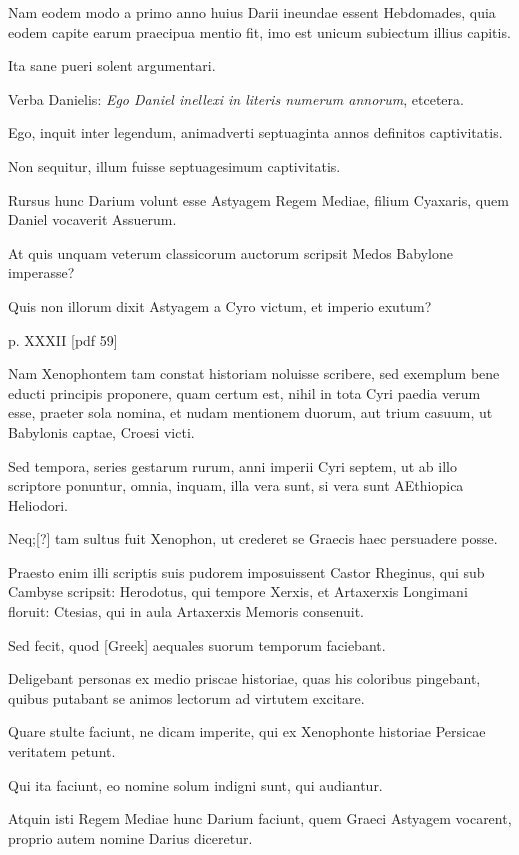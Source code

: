 \begin{parnumbers}
Nam eodem modo
a primo anno huius Darii ineundae essent Hebdomades, quia eodem
capite earum praecipua mentio fit, imo est unicum subiectum illius
capitis.

Ita sane pueri solent argumentari.

Verba Danielis: \textit{Ego
Daniel inellexi in literis numerum annorum}, etcetera.

Ego, inquit inter
legendum, animadverti septuaginta annos definitos captivitatis.

Non sequitur, illum fuisse septuagesimum captivitatis.

Rursus hunc
Darium volunt esse Astyagem Regem Mediae, filium Cyaxaris,
quem Daniel vocaverit Assuerum.

At quis unquam veterum classicorum
auctorum scripsit Medos Babylone imperasse?

Quis non
illorum dixit Astyagem a Cyro victum, et imperio exutum?

\clearpage
p. XXXII [pdf 59]

Nam Xenophontem tam constat historiam noluisse scribere, sed exemplum
bene educti principis proponere, quam certum est, nihil in tota Cyri
paedia verum esse, praeter sola nomina, et nudam mentionem duorum,
aut trium casuum, ut Babylonis captae, Croesi victi.

Sed tempora,
series gestarum rurum, anni imperii Cyri septem, ut ab illo
scriptore ponuntur, omnia, inquam, illa vera sunt, si vera sunt AEthiopica
Heliodori.

Neq;[?] tam sultus fuit Xenophon, ut crederet se
Graecis haec persuadere posse.

Praesto enim illi scriptis suis pudorem
imposuissent Castor Rheginus, qui sub Cambyse scripsit: Herodotus,
qui tempore Xerxis, et Artaxerxis Longimani floruit: Ctesias, qui in
aula Artaxerxis Memoris consenuit.

Sed fecit, quod \textgreek{[Greek]} aequales
suorum temporum faciebant.

Deligebant personas ex medio priscae
historiae, quas his coloribus pingebant, quibus putabant se animos
lectorum ad virtutem excitare.

Quare stulte faciunt, ne dicam
imperite, qui ex Xenophonte historiae Persicae veritatem petunt.

Qui ita faciunt, eo nomine solum indigni sunt, qui audiantur.

Atquin isti Regem Mediae hunc Darium faciunt, quem Graeci Astyagem
vocarent, proprio autem nomine Darius diceretur.


\end{parnumbers}
